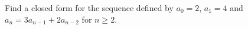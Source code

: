 Find a closed form for the sequence defined by $a_0=2$, $a_1=4$ and $a_n=3a_{n-1}+2a_{n-2}$ for $n\ge2$.
